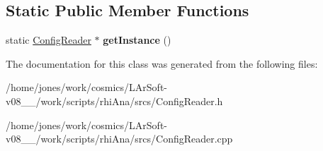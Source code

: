 \subsection*{Static Public Member Functions}
\begin{DoxyCompactItemize}
\item 
\hypertarget{classcppsecrets_1_1ConfigReader_adcd7c11a5af6e062f96201302c2a90b0}{static \hyperlink{classcppsecrets_1_1ConfigReader}{Config\-Reader} $\ast$ {\bfseries get\-Instance} ()}\label{classcppsecrets_1_1ConfigReader_adcd7c11a5af6e062f96201302c2a90b0}

\end{DoxyCompactItemize}


The documentation for this class was generated from the following files\-:\begin{DoxyCompactItemize}
\item 
/home/jones/work/cosmics/\-L\-Ar\-Soft-\/v08\-\_\-\_/work/scripts/rhi\-Ana/srcs/Config\-Reader.\-h\item 
/home/jones/work/cosmics/\-L\-Ar\-Soft-\/v08\-\_\-\_/work/scripts/rhi\-Ana/srcs/Config\-Reader.\-cpp\end{DoxyCompactItemize}
